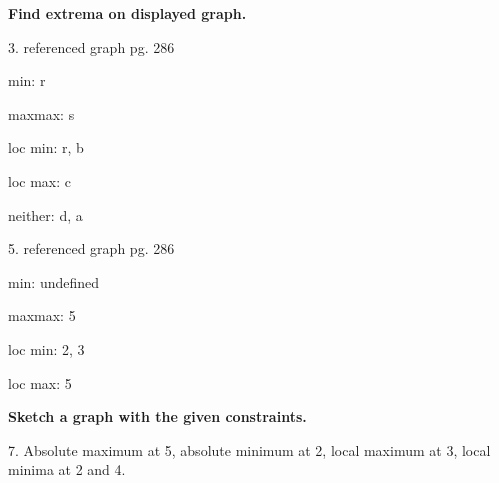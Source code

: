\documentclass{article}
\begin{document}
\begin{description} %
    \setlength\itemsep{5em}

    \item\textbf{Find extrema on displayed graph.}

          \begin{description} %
              \setlength\itemsep{3em}

              \item 3. referenced graph pg. 286
                    \begin{description}
                        \item min: r
                        \item maxmax: s
                        \item loc min: r, b
                        \item loc max: c
                        \item neither: d, a
                    \end{description}

              \item 5. referenced graph pg. 286
                    \begin{description}
                        \item min: undefined
                        \item maxmax: 5
                        \item loc min: 2, 3
                        \item loc max: 5
                    \end{description}
          \end{description}

    \item\textbf{Sketch a graph with the given constraints.}

          7. Absolute maximum at 5, absolute minimum at 2, local maximum at 3, local minima at 2 and 4. \\



\end{description}
\end{document}
